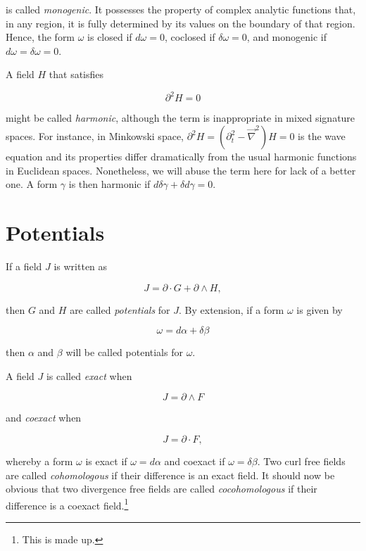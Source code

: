 \documentclass{article}
\begin{document}
is called \emph{monogenic}. It possesses the property of complex analytic functions that, in any region, it is fully determined by its values on the boundary of that region. Hence, the form $\omega$ is closed if $d \omega = 0$, coclosed if $\delta \omega = 0$, and monogenic if $d \omega = \delta \omega = 0$.

A field $H$ that satisfies

\begin{equation}
  \partial^2 H = 0
\end{equation}

might be called \emph{harmonic}, although the term is inappropriate in mixed signature spaces. For instance, in Minkowski space, $\partial^2 H = (\partial_t^2 - \vec \nabla^2) H = 0$ is the wave equation and its properties differ dramatically from the usual harmonic functions in Euclidean spaces. Nonetheless, we will abuse the term here for lack of a better one. A form $\gamma$ is then harmonic if $d \delta \gamma + \delta d \gamma = 0$.

\section{Potentials}

If a field $J$ is written as

\begin{equation}
  J = \partial \cdot G + \partial \wedge H,
\end{equation}

then $G$ and $H$ are called \emph{potentials} for $J$. By extension, if a form $\omega$ is given by

\begin{equation}
  \omega = d \alpha + \delta \beta
\end{equation}

then $\alpha$ and $\beta$ will be called potentials for $\omega$.

A field $J$ is called \emph{exact} when

\begin{equation}
  J = \partial \wedge F
\end{equation}

and \emph{coexact} when

\begin{equation}
  J = \partial \cdot F,
\end{equation}

whereby a form $\omega$ is exact if $\omega = d \alpha$ and coexact if $\omega = \delta \beta$. Two curl free fields are called \emph{cohomologous} if their difference is an exact field. It should now be obvious that two divergence free fields are called \emph{cocohomologous} if their difference is a coexact field.\footnote{This is made up.}
\end{document}
